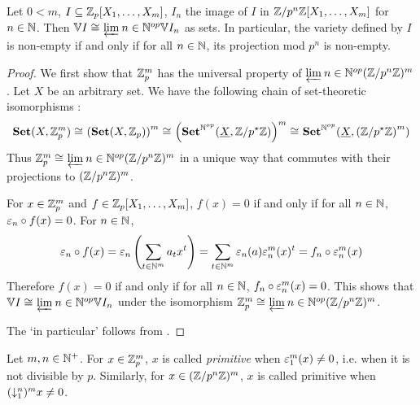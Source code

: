 \begin{prop}

  Let $0 < m$, $I \subseteq \mathbb{Z}_p[X_1,\dots,X_m]$, $I_n$ the image of $I$
  in $\mathbb{Z}/p^n\mathbb{Z}[X_1,\dots,X_m]$ for $n \in \mathbb{N}$. 
  Then $\mathbb{V}{I} \cong_{} \varprojlim_{{}}{n \in \mathbb{N}^{op}} \mathbb{V}{I_n}$ as sets. 
  In particular, 
  the variety defined by $I$ is non-empty if and only if 
  for all $n\in \mathbb{N}$, its projection mod $p^n$ is non-empty. 
\end{prop}
\begin{proof}
  
  We first show that $\mathbb{Z}_p^m$ has the universal property of 
  $\varprojlim_{{}}{n \in \mathbb{N}^{op}} (\mathbb{Z}/p^n\mathbb{Z})^m$. 
  Let $X$ be an arbitrary set. 
  We have the following chain of set-theoretic isomorphisms : 
  \begin{align*}
    \mathbf{Set}(X,\mathbb{Z}_p^m) \cong_{} \left(\mathbf{Set}(X,\mathbb{Z}_p)\right)^m 
    \cong_{} \left(\mathbf{Set}^{\mathbb{N}^{op}}(\underline{X},\mathbb{Z}/p^\star\mathbb{Z})\right)^m 
    \cong_{} \mathbf{Set}^{\mathbb{N}^{op}}(\underline{X},\left(\mathbb{Z}/p^\star\mathbb{Z}\right)^m)
  \end{align*}
  Thus $\mathbb{Z}_p^m \cong_{} \varprojlim_{{}}{n\in\mathbb{N}^{op}} (\mathbb{Z}/p^n\mathbb{Z})^m$ in a unique way that 
  commutes with their projections to $(\mathbb{Z}/p^n\mathbb{Z})^m$. 

  For $x \in \mathbb{Z}_p^m$ and $f \in \mathbb{Z}_p[X_1,\dots,X_m]$,
  $f(x) = 0$ if and only if for all $n \in \mathbb{N}$, $\varepsilon_n\circ f(x) = 0$. 
  For $n \in \mathbb{N}$, \[
    \varepsilon_n\circ f(x) = \varepsilon_n\left(\sum_{t\in\mathbb{N}^m}^{}a_tx^t\right)
    = \sum_{t\in\mathbb{N}^m}^{}\varepsilon_n(a)\varepsilon_n^m(x)^t
    = f_n\circ\varepsilon_n^m(x)
  \]
  Therefore $f(x) = 0$ if and only if 
  for all $n\in\mathbb{N}$, $f_n\circ\varepsilon_n^m(x) = 0$.
  This shows that $\mathbb{V}{I} \cong_{} \varprojlim_{{}}{n \in \mathbb{N}^{op}} \mathbb{V}{I_n}$
  under the isomorphism $\mathbb{Z}_p^m \cong_{} \varprojlim_{{}}{n\in\mathbb{N}^{op}} (\mathbb{Z}/p^n\mathbb{Z})^m$. 

  The `in particular' follows from 
  .
\end{proof}

\begin{dfn}
  
  Let $m, n \in \mathbb{N}^+$. 
  For $x \in \mathbb{Z}_p^m$, $x$ is called \emph{primitive} when $\varepsilon_1^m(x) \neq 0$,
  i.e. when it is not divisible by $p$. 
  Similarly, for $x \in (\mathbb{Z}/p^n\mathbb{Z})^m$, 
  $x$ is called primitive when $(\downarrow_{1}^{n})^m x \neq 0$. 
\end{dfn}

